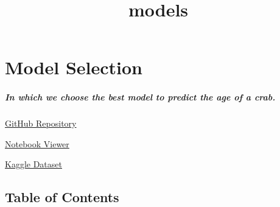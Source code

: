 \documentclass[11pt]{article}
\title{models}
\begin{document}
    
    \maketitle
    
    

    
    \section{Model Selection}\label{model-selection}

\subparagraph{\texorpdfstring{\emph{In which we choose the best model to
predict the age of a
crab.}}{In which we choose the best model to predict the age of a crab.}}\label{in-which-we-choose-the-best-model-to-predict-the-age-of-a-crab.}

\href{https://github.com/ahester57/ai_workshop/tree/master/notebooks/time_for_crab/1-models}{GitHub
Repository}

\href{https://nbviewer.jupyter.org/github/ahester57/ai_workshop/blob/master/notebooks/time_for_crab/1-models/models.ipynb}{Notebook
Viewer}

\href{https://www.kaggle.com/sidhus/crab-age-prediction}{Kaggle Dataset}

    \subsection{Table of Contents}\label{table-of-contents}
\end{document}
